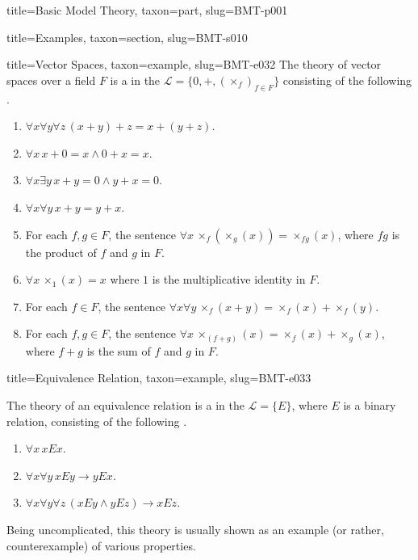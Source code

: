 \documentclass[a4paper]{article}
\begin{document}
\begin{tree}{title={Basic Model Theory}, taxon={part}, slug={BMT-p001}}
\begin{tree}{title={Examples}, taxon={section}, slug={BMT-s010}}
\begin{tree}{title={Vector Spaces}, taxon={example}, slug={BMT-e032}}
    The theory of vector spaces over a field \(F\) is a  in the  \(\mathcal  L= \{ 0,+,( \times _f)_{f \in  F} \}\)
    consisting of the following .
    \begin{enumerate}
\item{\(\forall  x \forall  y \forall  z \, (x+y)+z=x+(y+z)\).
        }
        \item{\(\forall  x \, x+0=x \land0 +x=x\).
        }
        \item{\(\forall  x \exists  y \, x+y=0 \land  y+x=0\).
        }
        \item{\(\forall  x \forall  y \, x+y=y+x\).
        }
        \item{
            For each \(f,g \in  F\), the sentence \(\forall  x \, \times _f( \times _g(x)) =  \times _{fg}(x)\), where \(fg\) is the product of \(f\) and \(g\) in \(F\).
        }
        \item{\(\forall  x \, \times _1(x) = x\) where \(1\) is the multiplicative identity in \(F\).
        }
        \item{
            For each \(f \in  F\), the sentence \(\forall  x \forall  y \, \times _f(x+y) =  \times _f(x)+ \times _f(y)\).
        }
        \item{
            For each \(f,g \in  F\), the sentence \(\forall  x \, \times _(f+g)(x) =  \times _f(x)+ \times _g(x)\), where \(f+g\) is the sum of \(f\) and \(g\) in \(F\).
        }
\end{enumerate}
\end{tree}

\begin{tree}{title={Equivalence Relation}, taxon={example}, slug={BMT-e033}}

    The theory of an equivalence relation is a  in the  \(\mathcal  L= \{ E \}\),
    where \(E\) is a binary relation, consisting of the following .
    \begin{enumerate}
\item{\(\forall  x \, xEx\).
        }
        \item{\(\forall  x \forall  y \, xEy \rightarrow  yEx\).
        }
        \item{\(\forall  x \forall  y \forall  z \, (xEy \land  yEz) \rightarrow  xEz\).
        }
\end{enumerate}\par{
    Being uncomplicated, this theory is usually shown as an example (or rather, counterexample) of various properties.
}
\end{tree}

\end{tree}


\end{tree}
\end{document}
